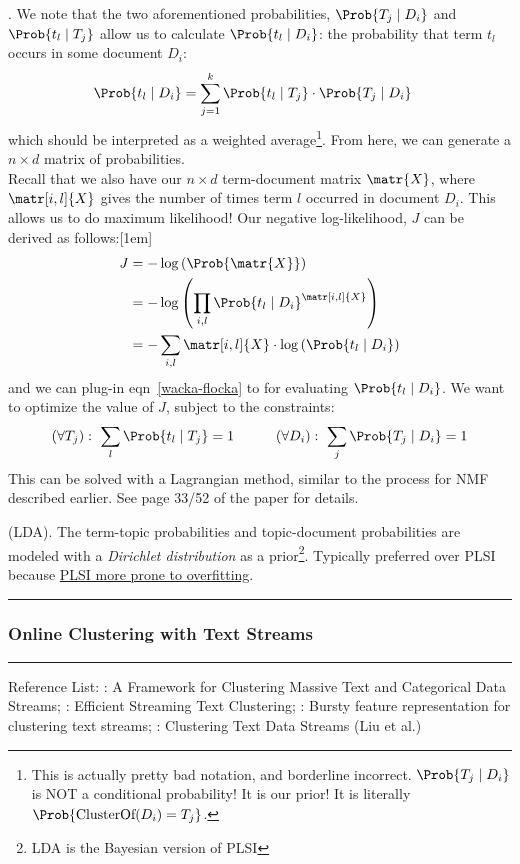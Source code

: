 \documentclass[11pt]{article}
\newcommand\myspace[1][]{\vspace{#1\bigskipamount}}
\newcommand\p{\Needspace{10\baselineskip} \noindent}
\newcommand\subsub[1]{\Needspace{15\baselineskip}\hrule\subsubsection{#1}\hrule}
\newcommand\myref[1]{\purple{[#1]}}
\begin{document}
\myspace
\p {}. We note that the two aforementioned probabilities, $\Prob{T_j \mid D_i}$ and $\Prob{t_l \mid T_j}$ allow us to calculate $\Prob{t_l \mid D_i}$: the probability that term $t_l$ occurs in some document $D_i$:
\begin{align}
	\Prob{t_l \mid D_i} &= \sum_{j = 1}^{k} \Prob{t_l \mid T_j} \cdot \Prob{T_j \mid D_i} \label{wacka-flocka}
\end{align}
which should be interpreted as a weighted average\footnote{This is actually pretty bad notation, and borderline incorrect. $\Prob{T_j \mid D_i}$ is NOT a conditional probability! It is our prior! It is literally $\Prob{\text{ClusterOf}(D_i) = T_j}$.}. From here, we can generate a $n \times d$ matrix of probabilities. \\


\p Recall that we also have our $n \times d$ term-document matrix $\matr{X}$, where $\matr[i, l]{X}$ gives the number of times term $l$ occurred in document $D_i$. This allows us to do maximum likelihood! Our negative log-likelihood, $J$ can be derived as follows:[1em]
\begin{align}
	J &= - \log\left(  \Prob{\matr{X}} \right) \\
	&= - \log\left( \prod_{i, l} \Prob{ t_l \mid D_i   }^{ \matr[i, l]{X} } \right) \\
	&= - \sum_{i, l} \matr[i, l]{X} \cdot \log\left(  \Prob{ t_l \mid D_i   } \right) 
\end{align}
and we can plug-in eqn~\ref{wacka-flocka} to for evaluating $\Prob{ t_l \mid D_i}$. We want to optimize the value of $J$, subject to the constraints:
\begin{align}
	(\forall T_j): ~ \sum_l \Prob{t_l \mid T_j} = 1 
	\qquad\quad 
	(\forall D_i): ~ \sum_j \Prob{T_j \mid D_i} = 1
\end{align}
This can be solved with a Lagrangian method, similar to the process for NMF described earlier. See page 33/52 of the paper for details.

\myspace 
\p {} (LDA). The term-topic probabilities and topic-document probabilities are modeled with a \textit{Dirichlet distribution} as a prior\footnote{LDA is the Bayesian version of PLSI}. Typically preferred over PLSI because \underline{PLSI more prone to overfitting}.

\myspace\myspace{}
\subsub{Online Clustering with Text Streams}
\begin{center}
\linespread{0.5}\tiny Reference List: \myref{3}: A Framework for Clustering Massive Text and Categorical Data Streams; \purple{[112]}: Efficient Streaming Text Clustering; \myref{48}: Bursty feature representation
for clustering text streams; \myref{61}: Clustering Text Data Streams (Liu et al.)
\end{center}
\myspace
\end{document}
